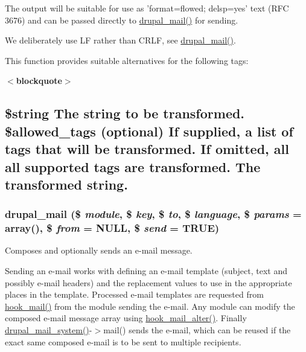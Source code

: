 The output will be suitable for use as 'format=flowed; delsp=yes' text (RFC 3676) and can be passed directly to \hyperlink{mail_8inc_ab80781fd7273975a77cbbd13300eddbf}{drupal\_\-mail()} for sending.

We deliberately use LF rather than CRLF, see \hyperlink{mail_8inc_ab80781fd7273975a77cbbd13300eddbf}{drupal\_\-mail()}.

This function provides suitable alternatives for the following tags:  {\itshape  {\itshape  {\bfseries  {\bfseries  \par
 }}\/}\/}

{\itshape {\itshape {\bfseries {\bfseries  $<$blockquote$>$ 
\begin{DoxyItemize}
\end{DoxyItemize}
\begin{DoxyEnumerate}
\item 
\begin{DoxyDescription}
\item[]\subsection*{\$string The string to be transformed.  \$allowed\_\-tags (optional) If supplied, a list of tags that will be transformed. If omitted, all all supported tags are transformed.   The transformed string. }


\end{DoxyDescription}
\end{DoxyEnumerate}}}\/}\/}\hypertarget{mail_8inc_ab80781fd7273975a77cbbd13300eddbf}{
\subsubsection[{drupal\_\-mail}]{\setlength{\rightskip}{0pt plus 5cm}drupal\_\-mail (\$ {\em module}, \/  \$ {\em key}, \/  \$ {\em to}, \/  \$ {\em language}, \/  \$ {\em params} = {\ttfamily array()}, \/  \$ {\em from} = {\ttfamily NULL}, \/  \$ {\em send} = {\ttfamily TRUE})}}
\label{mail_8inc_ab80781fd7273975a77cbbd13300eddbf}
Composes and optionally sends an e-\/mail message.

Sending an e-\/mail works with defining an e-\/mail template (subject, text and possibly e-\/mail headers) and the replacement values to use in the appropriate places in the template. Processed e-\/mail templates are requested from \hyperlink{group__hooks_gacdeb1cba0d0a86ac4de3fff7d4765777}{hook\_\-mail()} from the module sending the e-\/mail. Any module can modify the composed e-\/mail message array using \hyperlink{group__hooks_gaad1d55a8e7b359933f462a9ca5b2ede0}{hook\_\-mail\_\-alter()}. Finally \hyperlink{mail_8inc_a6ba240b2e368447935c9bcb114f59a1a}{drupal\_\-mail\_\-system()}-\/$>$mail() sends the e-\/mail, which can be reused if the exact same composed e-\/mail is to be sent to multiple recipients.

